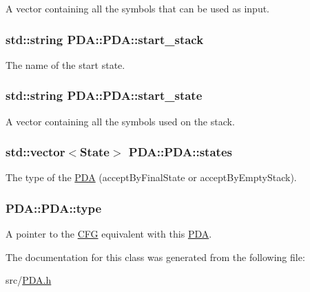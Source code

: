 A vector containing all the symbols that can be used as input. 

\hypertarget{classPDA_1_1PDA_a253c02338c616cd8e8882f71e2a5666f}{
\subsubsection[{start\-\_\-stack}]{\setlength{\rightskip}{0pt plus 5cm}std\-::string P\-D\-A\-::\-P\-D\-A\-::start\-\_\-stack\hspace{0.3cm}{\ttfamily [private]}}}\label{classPDA_1_1PDA_a253c02338c616cd8e8882f71e2a5666f}


The name of the start state. 

\hypertarget{classPDA_1_1PDA_af346efb9a6812d704d69299eef9262e6}{
\subsubsection[{start\-\_\-state}]{\setlength{\rightskip}{0pt plus 5cm}std\-::string P\-D\-A\-::\-P\-D\-A\-::start\-\_\-state\hspace{0.3cm}{\ttfamily [private]}}}\label{classPDA_1_1PDA_af346efb9a6812d704d69299eef9262e6}


A vector containing all the symbols used on the stack. 

\hypertarget{classPDA_1_1PDA_a38d40f2c938f18d396ea2b13ca361271}{
\subsubsection[{states}]{\setlength{\rightskip}{0pt plus 5cm}std\-::vector$<${\bf State}$>$ P\-D\-A\-::\-P\-D\-A\-::states\hspace{0.3cm}{\ttfamily [private]}}}\label{classPDA_1_1PDA_a38d40f2c938f18d396ea2b13ca361271}


The type of the \hyperlink{classPDA_1_1PDA}{P\-D\-A} (accept\-By\-Final\-State or accept\-By\-Empty\-Stack). 

\hypertarget{classPDA_1_1PDA_a15524b46d2be399f384b0f236ccb38f4}{
\subsubsection[{type}]{ P\-D\-A\-::\-P\-D\-A\-::type\hspace{0.3cm}{\ttfamily [private]}}}\label{classPDA_1_1PDA_a15524b46d2be399f384b0f236ccb38f4}


A pointer to the \hyperlink{classCFG}{C\-F\-G} equivalent with this \hyperlink{classPDA_1_1PDA}{P\-D\-A}. 



The documentation for this class was generated from the following file\-:\begin{DoxyCompactItemize}
\item 
src/\hyperlink{PDA_8h}{P\-D\-A.\-h}\end{DoxyCompactItemize}
